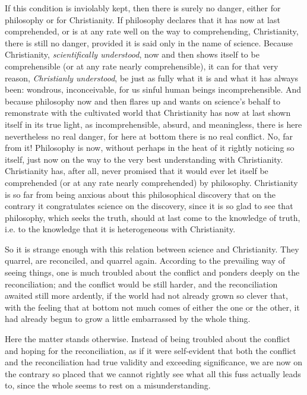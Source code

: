 \documentclass[12pt,a4paper]{book}
\begin{document}
If this condition is inviolably kept, then there is surely no danger, either
for philosophy or for Christianity. If philosophy declares that it has now at
last comprehended, or is at any rate well on the way to comprehending,
Christianity, there is still no danger, provided it is said only in the name of
science. Because Christianity, \emph{scientifically understood}, now and then
shows itself to be comprehensible (or at any rate nearly comprehensible), it
can for that very reason, \emph{Christianly understood}, be just as fully what
it is and what it has always been: wondrous, inconceivable, for us sinful human
beings incomprehensible. And because philosophy now and then flares up and
wants on science's behalf to remonstrate with the cultivated world that
Christianity has now at last shown itself in its true light, as
incomprehensible, absurd, and meaningless, there is here nevertheless no real
danger, for here at bottom there is no real conflict. No, far from it!
Philosophy is now, without perhaps in the heat of it rightly noticing so
itself, just now on the way to the very best understanding with Christianity.
Christianity has, after all, never promised that it would ever let itself be
comprehended (or at any rate nearly comprehended) by philosophy. Christianity
is so far from being anxious about this philosophical discovery that on the
contrary it congratulates science on the discovery, since it is so glad to see
that philosophy, which seeks the truth, should at last come to the knowledge of
truth, i.e. to the knowledge that it is heterogeneous with Christianity.

So it is strange enough with this relation between science and Christianity.
They quarrel, are reconciled,
and quarrel again. According to the prevailing way of seeing things, one is
much troubled about the conflict and ponders deeply on the reconciliation; and
the conflict would be still harder, and the reconciliation awaited still more
ardently, if the world had not already grown so clever that, with the feeling
that at bottom not much comes of either the one or the other, it had already
begun to grow a little embarrassed by the whole thing.

Here the matter stands otherwise. Instead of being troubled about the conflict
and hoping for the reconciliation, as if it were self-evident that both the
conflict and the reconciliation had true validity and exceeding significance,
we are now on the contrary so placed that we cannot rightly see what all this
fuss actually leads to, since the whole seems to rest on a misunderstanding.
\end{document}
